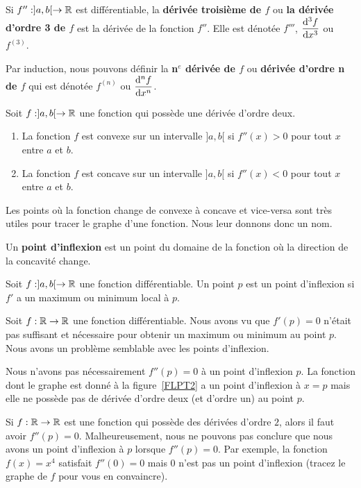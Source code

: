 {\begin{focus}{\dfn}
Si $f'':]a,b[\to \mathbb{R}$ est différentiable, la
{\bfseries dérivée troisième de $f$} ou
{\bfseries la dérivée d'ordre 3 de $f$} est la dérivée de la fonction
$f''$.  Elle est dénotée $f'''$, $\displaystyle \frac{\mathrm{d}^{3}f}{\mathrm{d}x^{3}}$ ou
$f^{(3)}$.

Par induction, nous pouvons définir la {\bfseries n$^e$ dérivée de $f$} 
ou {\bfseries dérivée d'ordre n de $f$} qui
est dénotée $f^{(n)}$ ou $\displaystyle \frac{\mathrm{d}^{n}f}{\mathrm{d}x^{n}}$.
\end{focus}

\begin{focus}{\prp}\label{seccondDerCon}
Soit $f:]a,b[\rightarrow \mathbb{R}$ une fonction qui possède une dérivée
d'ordre deux.
\begin{enumerate}
\item La fonction $f$ est convexe sur un intervalle $]a,b[$ si
$f''(x)>0$ pour tout $x$ entre $a$ et $b$.
\item La fonction $f$ est concave sur un intervalle $]a,b[$ si
$f''(x)<0$ pour tout $x$ entre $a$ et $b$.
\end{enumerate}
\end{focus}

Les points où la fonction change de convexe à concave et vice-versa
sont très utiles pour tracer le graphe d'une fonction.  Nous leur donnons
donc un nom.

\begin{focus}{\dfn}  
Un {\bfseries point d'inflexion} est un point du domaine de la
fonction où la direction de la concavité change.
\end{focus}

\begin{focus}{\prp}
Soit $f:]a,b[ \to \mathbb{R}$ une fonction différentiable.  Un point $p$ est
un point d'inflexion si $f'$ a un maximum ou minimum local à $p$.
\end{focus}

\begin{rmk}
Soit $f:\mathbb{R}\rightarrow \mathbb{R}$ une fonction différentiable.  Nous avons vu que
$f'(p) = 0$ n'était pas suffisant et nécessaire pour obtenir un
maximum ou minimum au point $p$.  Nous avons un problème semblable avec les
points d'inflexion.

Nous n'avons pas nécessairement $f''(p)=0$ à un point d'inflexion $p$.  
La fonction dont le graphe est donné à la figure~\ref{FLPT2} a un
point d'inflexion à $x=p$ mais elle ne possède pas de dérivée d'ordre
deux (et d'ordre un) au point $p$.

Si $f:\mathbb{R}\rightarrow \mathbb{R}$ est une fonction qui possède des dérivées
d'ordre $2$, alors il faut avoir $f''(p) = 0$.  Malheureusement, nous ne
pouvons pas conclure que nous avons un point d'inflexion à $p$ lorsque
$f''(p)=0$.   Par exemple, la fonction $f(x) = x^4$ satisfait
$f''(0) = 0$ mais $0$ n'est pas un point d'inflexion (tracez le graphe
de $f$ pour vous en convaincre).


\end{rmk}}

